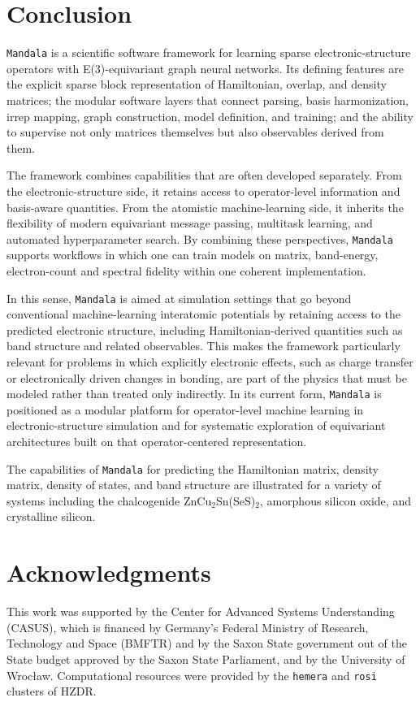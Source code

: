 \documentclass[preprint,12pt,compress,numafflabel]{elsarticle}
\begin{document}
\section{Conclusion}
\label{sec:conclusion}

\texttt{Mandala} is a scientific software framework for learning sparse electronic-structure operators with E(3)-equivariant graph neural networks. Its defining features are the explicit sparse block representation of Hamiltonian, overlap, and density matrices; the modular software layers that connect parsing, basis harmonization, irrep mapping, graph construction, model definition, and training; and the ability to supervise not only matrices themselves but also observables derived from them.

The framework combines capabilities that are often developed separately. From the electronic-structure side, it retains access to operator-level information and basis-aware quantities. From the atomistic machine-learning side, it inherits the flexibility of modern equivariant message passing, multitask learning, and automated hyperparameter search. By combining these perspectives, \texttt{Mandala} supports workflows in which one can train models on matrix, band-energy, electron-count and spectral fidelity within one coherent implementation.

In this sense, \texttt{Mandala} is aimed at simulation settings that go beyond conventional machine-learning interatomic potentials by retaining access to the predicted electronic structure, including Hamiltonian-derived quantities such as band structure and related observables. This makes the framework particularly relevant for problems in which explicitly electronic effects, such as charge transfer or electronically driven changes in bonding, are part of the physics that must be modeled rather than treated only indirectly. In its current form, \texttt{Mandala} is positioned as a modular platform for operator-level machine learning in electronic-structure simulation and for systematic exploration of equivariant architectures built on that operator-centered representation.

The capabilities of \texttt{Mandala} for predicting the Hamiltonian matrix, density matrix, density of states, and band structure are illustrated for a variety of systems including the chalcogenide ZnCu$_2$Sn(SeS)$_2$, amorphous silicon oxide, and crystalline silicon.


\section*{Acknowledgments}

This work was supported by the Center for Advanced Systems Understanding (CASUS), which is financed by Germany’s Federal Ministry of Research, Technology and Space (BMFTR) and by the Saxon State government out of the State budget approved by the Saxon State Parliament, and by the University of Wroc\l aw. Computational resources were provided by the \texttt{hemera} and \texttt{rosi} clusters of HZDR.


\clearpage



\clearpage
\appendix

\end{document}

